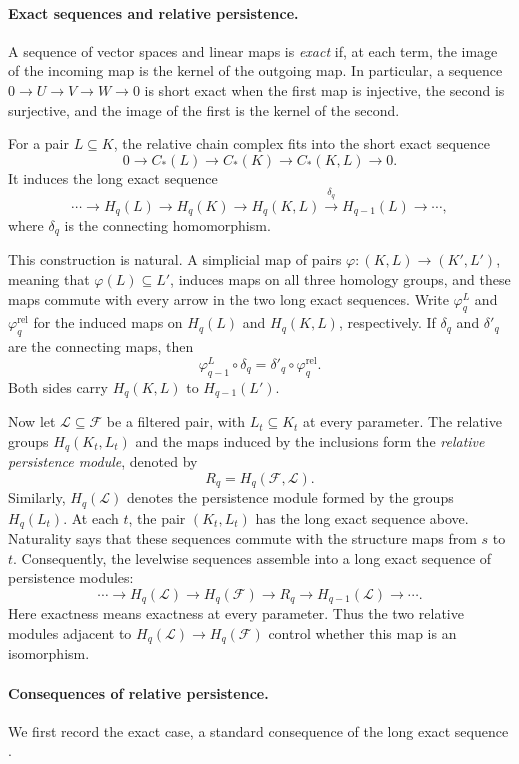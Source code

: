\documentclass[11pt,letterpaper]{article}
\theoremstyle{definition}
\begin{document}
\paragraph{Exact sequences and relative persistence.}
A sequence of vector spaces and linear maps is \emph{exact} if, at each term,
the image of the incoming map is the kernel of the outgoing map. In
particular, a sequence $0\to U\to V\to W\to0$ is short exact when the first
map is injective, the second is surjective, and the image of the first is the
kernel of the second.

For a pair $L\subseteq K$, the relative chain complex fits into the short
exact sequence
$$
0\longrightarrow C_*(L)
\longrightarrow C_*(K)
\longrightarrow C_*(K,L)
\longrightarrow0.
$$
It induces the long exact sequence
$$
\cdots\longrightarrow H_q(L)
\longrightarrow H_q(K)
\longrightarrow H_q(K,L)
\xrightarrow{\delta_q}H_{q-1}(L)
\longrightarrow\cdots,
$$
where $\delta_q$ is the connecting homomorphism.

This construction is natural. A simplicial map of pairs
$\varphi:(K,L)\to(K',L')$, meaning that $\varphi(L)\subseteq L'$, induces
maps on all three homology groups, and these maps commute with every arrow in
the two long exact sequences. Write
$\varphi^L_q$ and $\varphi^{\mathrm{rel}}_q$ for the induced maps on
$H_q(L)$ and $H_q(K,L)$, respectively. If $\delta_q$ and $\delta'_q$ are the
connecting maps, then
$$
\varphi^L_{q-1}\circ\delta_q
=\delta'_q\circ\varphi^{\mathrm{rel}}_q.
$$
Both sides carry $H_q(K,L)$ to $H_{q-1}(L')$.

Now let $\mathcal L\subseteq\mathcal F$ be a filtered pair, with
$L_t\subseteq K_t$ at every parameter. The relative groups
$H_q(K_t,L_t)$ and the maps induced by the inclusions form the
\emph{relative persistence module}, denoted by
$$
R_q=H_q(\mathcal F,\mathcal L).
$$
Similarly, $H_q(\mathcal L)$ denotes the persistence module formed by the
groups $H_q(L_t)$.
At each $t$, the pair $(K_t,L_t)$ has the long exact sequence above.
Naturality says that these sequences commute with the structure maps from
$s$ to $t$. Consequently, the levelwise sequences assemble into a long exact
sequence of persistence modules:
$$
\cdots\longrightarrow H_q(\mathcal L)
\longrightarrow H_q(\mathcal F)
\longrightarrow R_q
\longrightarrow H_{q-1}(\mathcal L)
\longrightarrow\cdots.
$$
Here exactness means exactness at every parameter. Thus the two relative
modules adjacent to $H_q(\mathcal L)\to H_q(\mathcal F)$ control whether this
map is an isomorphism.

\paragraph{Consequences of relative persistence.}
We first record the exact case, a standard consequence of the long exact
sequence \cite[Section~IV.4]{EdelsbrunnerHarer2010}.
\end{document}
